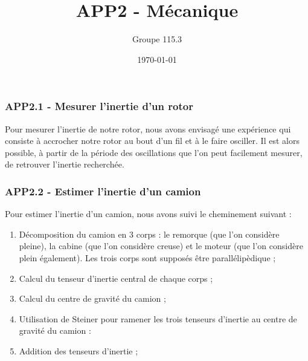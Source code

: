 \documentclass[pdf]{beamer}
\title{APP2 - Mécanique}
\author{Groupe 115.3}
\date{\today}
\begin{document}
\begin{frame}
	\titlepage
\end{frame}

\begin{frame}
	\frametitle{APP2.1 - Mesurer l'inertie d'un rotor}
	
	Pour mesurer l'inertie de notre rotor, nous avons envisagé une expérience
	qui consiste à accrocher notre rotor au bout d'un fil et à le faire osciller.
	Il est alors possible, à partir de la période des oscillations que l'on peut
	facilement mesurer, de retrouver l'inertie recherchée.
	
\end{frame}

\begin{frame}
	\frametitle{APP2.2 - Estimer l'inertie d'un camion}	

	Pour estimer l'inertie d'un camion, nous avons suivi le cheminement suivant :
	
	\begin{enumerate}
		\item Décomposition du camion en 3 corps : le remorque (que l'on considère
		pleine), la cabine (que l'on considère creuse) et le moteur (que l'on considère
		plein également). Les trois corps sont supposés être parallélipèdique ;
		\item Calcul du tenseur d'inertie central de chaque corps ;
		\item Calcul du centre de gravité du camion ;
		\item Utilisation de Steiner pour ramener les trois tenseurs d'inertie
		au centre de gravité du camion :
		\item Addition des tenseurs d'inertie ;
	\end{enumerate}
	
\end{frame}
\end{document}
